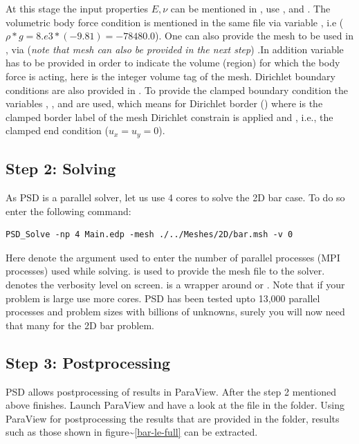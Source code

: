 At this stage the input properties \(E,\nu\) can be mentioned in
, use , and .
The volumetric body force condition is mentioned in the same file via
variable , i.e (\(\rho*g=8.e3*(-9.81)=-78480.0\)).
One can also provide the mesh to be used in ,
via 
(\textit{note that mesh can also be provided in the next step}) .In
addition variable  has to be provided in order to indicate
the volume (region) for which the body force is acting, here  is
the integer volume tag of the mesh. Dirichlet boundary conditions are
also provided in . To provide the clamped
boundary condition the variables , , and
 are used, which means for Dirichlet border 
() where  is the clamped border label of the mesh
Dirichlet constrain is applied and ,  i.e.,
the clamped end condition (\(u_x=u_y=0\)).

\subsection{Step 2: Solving}

As PSD is a parallel solver, let us use 4 cores to solve the 2D bar
case. To do so enter the following command:

\begin{lstlisting}[style=BashInputStyle]
PSD_Solve -np 4 Main.edp -mesh ./../Meshes/2D/bar.msh -v 0
\end{lstlisting}

Here  denote the argument used to enter the number of
parallel processes (MPI processes) used while solving.
 is used to provide the mesh file to
the solver.  denotes the verbosity level on screen.
 is a wrapper around  or
. Note that if your problem is large use more cores.
PSD has been tested upto 13,000 parallel processes and problem sizes
with billions of unknowns, surely you will now need that many for the 2D
bar problem.

\subsection{Step 3: Postprocessing}

PSD allows postprocessing of results in ParaView. After the step 2
mentioned above finishes. Launch ParaView and have a look at the
 file in the  folder. Using ParaView for
postprocessing the results that are provided in the 
folder, results such as those shown in
figure\textasciitilde{}\ref{bar-le-full} can be extracted.

